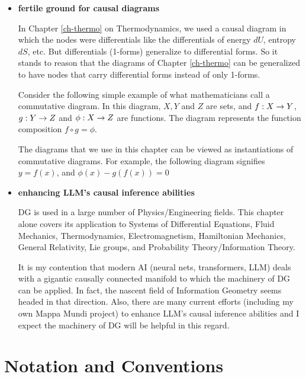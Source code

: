 \begin{itemize}

\item {\bf fertile ground for 
causal diagrams}

In Chapter \ref{ch-thermo} on Thermodynamics, we used a causal diagram in which the nodes were
differentials like the differentials of energy $dU$,
entropy $dS$, etc.
But differentials (1-forms) 
generalize to differential forms. So
it stands to reason that
the diagrams of
Chapter \ref{ch-thermo} 
can be generalized to have nodes 
that carry differential forms
instead of only 1-forms.

Consider the following simple example of 
what mathematicians call a
commutative diagram.
In this diagram, $X, Y$ and $Z$ are sets,
and $f:X\rightarrow Y$, $g:Y\rightarrow Z$ 
and $\phi:X\rightarrow Z$
are functions.
The diagram
represents
the function composition $f\circ g= \phi$.

\beq
{}
\eeq
The diagrams that we use 
in this chapter can be viewed as
instantiations  of commutative diagrams. For example,
the following diagram
signifies $y =f(x)$,
and $\phi(x)-g(f(x))=0$

\beq
{}
\eeq

\item {\bf
enhancing LLM's causal inference abilities}

DG
is used in a large number of
Physics/Engineering fields.
This chapter alone
covers its application to
Systems of Differential Equations, Fluid Mechanics,
Thermodynamics, Electromagnetism, Hamiltonian Mechanics, General Relativity, 
Lie groups, and Probability 
Theory/Information Theory.

It is my contention that
 modern AI (neural nets,
transformers, LLM)
deals with a gigantic 
causally connected manifold
to which the machinery 
of DG can be applied.
In fact, the nascent
field of Information Geometry
seems headed in that direction.
Also, there are many current efforts (including my own Mappa Mundi project)
to enhance
LLM's  causal inference abilities and I expect the machinery
of DG will
be helpful in this regard.


\end{itemize}




\section{Notation
and Conventions}

